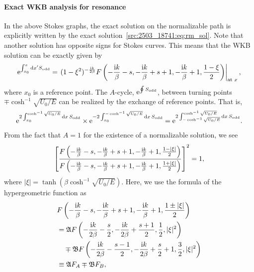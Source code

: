 \paragraph{Exact WKB analysis for resonance}\label{src:2503_18741:rm_ewkb}
In the above Stokes graphs, the exact solution on the normalizable path
is explicitly written by the exact solution~\eqref{src:2503_18741:eq:rm_sol}.
Note that another solution has opposite signs for Stokes curves.
This means that the WKB solution can be exactly given by
\begin{align}
    \mathrm{e}^{\int_{x_0}^{x} \mathrm{d} x' S_{\mathrm{odd}}}
    = \left.(1-\xi^2)^{-\frac{\mathrm{i} k}{2\beta}}
    F\left( -\frac{\mathrm{i} k}{\beta}-s, -\frac{\mathrm{i} k}{\beta}+s+1, -\frac{\mathrm{i} k}{\beta}+1, \frac{1-\xi}{2} \right)\right|_{\text{at $x$}},
\end{align}
where $x_0$ is a reference point.
The $A$-cycle, $\mathrm{e}^{\oint S_{\mathrm{odd}}}$, between turning points
$\mp\cosh^{-1}\sqrt{U_0/E}$ can be realized by the exchange of reference points.
That is,
\begin{align}
    \mathrm{e}^{2\int_{x_0}^{\cosh^{-1}\sqrt{U_0/E}} \mathrm{d} x\, S_{\mathrm{odd}}}
    \times \mathrm{e}^{-2\int_{x_0}^{-\cosh^{-1}\sqrt{U_0/E}} \mathrm{d} x\, S_{\mathrm{odd}}}
    = \mathrm{e}^{2\int_{-\cosh^{-1}\sqrt{U_0/E}}^{\cosh^{-1}\sqrt{U_0/E}} \mathrm{d} x\, S_{\mathrm{odd}}} .
\end{align}
From the fact that $A=1$ for the existence of a normalizable solution, we see
\begin{align}
    \left[
    \frac{F\left( -\frac{\mathrm{i} k}{\beta}-s, -\frac{\mathrm{i} k}{\beta}+s+1, -\frac{\mathrm{i} k}{\beta}+1, \frac{1-|\xi|}{2} \right)}
    {F\left( -\frac{\mathrm{i} k}{\beta}-s, -\frac{\mathrm{i} k}{\beta}+s+1, -\frac{\mathrm{i} k}{\beta}+1, \frac{1+|\xi|}{2} \right)}
    \right]^2
    = 1 ,
    \label{src:2503_18741:eq:quant_cond_F}
\end{align}
where $|\xi|=\tanh(\beta\cosh^{-1}\sqrt{U_0/E})$.
Here, we use the formula of the hypergeometric function as
\begin{align}
    &F\left( -\frac{\mathrm{i} k}{\beta}-s, -\frac{\mathrm{i} k}{\beta}+s+1, -\frac{\mathrm{i} k}{\beta}+1, \frac{1\pm|\xi|}{2} \right)\notag\\
    &= \mathfrak{A} F\left(-\frac{\mathrm{i} k}{2\beta}-\frac{s}{2},-\frac{\mathrm{i} k}{2\beta}+\frac{s+1}{2},\frac{1}{2},|\xi|^2\right)
    \notag\\
    &\quad\mp \mathfrak{B} F\left(-\frac{\mathrm{i} k}{2\beta}-\frac{s-1}{2},-\frac{\mathrm{i} k}{2\beta}+\frac{s}{2}+1,\frac{3}{2},|\xi|^2\right) \notag\\
    &\equiv \mathfrak{A} F_A \mp \mathfrak{B} F_B,
\end{align}
